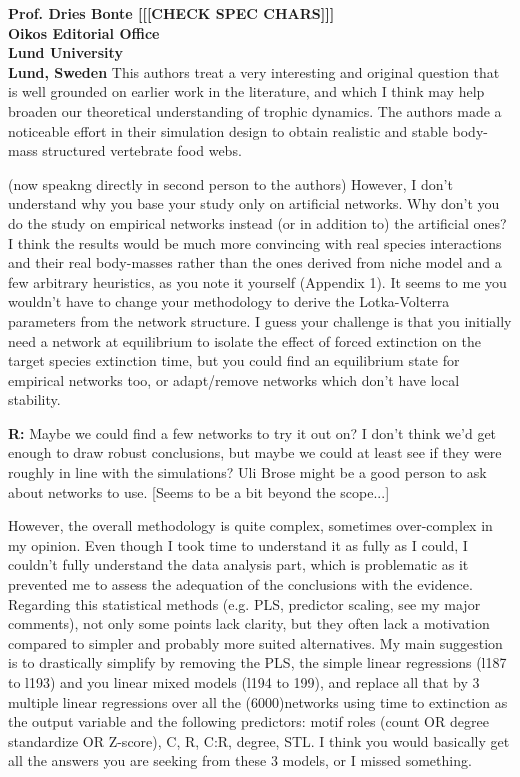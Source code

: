 \documentclass[12pt]{letter}
\begin{document}
\begin{letter}{\bf Prof. Dries Bonte [[[CHECK SPEC CHARS]]]\\
Oikos Editorial Office \\
Lund University \\
Lund, Sweden}
  This authors treat a very interesting and original question that is well grounded on earlier work in the literature, and which I think may help broaden our theoretical understanding of trophic dynamics. The authors made a noticeable effort in their simulation design to obtain realistic and stable body-mass structured vertebrate food webs.

  (now speakng directly in second person to the authors) However, I don’t understand why you base your study only on artificial networks. Why don’t you do the study on empirical networks instead (or in addition to) the artificial ones? I think the results would be much more convincing with real species interactions and their real body-masses rather than the ones derived from niche model and a few arbitrary heuristics, as you note it yourself (Appendix 1). It seems to me you wouldn’t have to change your methodology to derive the Lotka-Volterra parameters from the network structure. I guess your challenge is that you initially need a network at equilibrium to isolate the effect of forced extinction on the target species extinction time, but you could find an equilibrium state for empirical networks too, or adapt/remove networks which don’t have local stability.

  \textbf{R:}
  Maybe we could find a few networks to try it out on? I don't think we'd get enough to draw robust conclusions, but maybe we could at least see if they were roughly in line with the simulations? Uli Brose might be a good person to ask about networks to use.
  [Seems to be a bit beyond the scope...]


  However, the overall methodology is quite complex, sometimes over-complex in my opinion. Even though I took time to understand it as fully as I could, I couldn’t fully understand the data analysis part, which is problematic as it prevented me to assess the adequation of the conclusions with the evidence. Regarding this statistical methods (e.g. PLS, predictor scaling, see my major comments), not only some points lack clarity, but they often lack a motivation compared to simpler and probably more suited alternatives. My main suggestion is to drastically simplify by removing the PLS, the simple linear regressions (l187 to l193) and you linear mixed models (l194 to 199), and replace all that by 3 multiple linear regressions over all the (6000)networks using time to extinction as the output variable and the following predictors: motif roles (count OR degree standardize OR Z-score), C, R, C:R, degree, STL. I think you would basically get all the answers you are seeking from these 3 models, or I missed something.


\end{letter}
\end{document}
